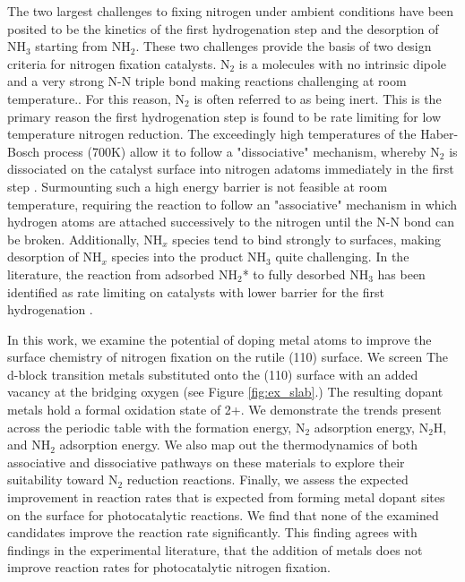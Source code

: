 The two largest challenges to fixing nitrogen under ambient conditions have been posited to be the kinetics of the first hydrogenation step and the desorption of NH$_3$ starting from NH$_2$.\cite{Hoskuldsson_2017,Singh_2017,Montoya_2015} These two challenges provide the basis of two design criteria for nitrogen fixation catalysts. N$_2$ is a molecules with no intrinsic dipole and a very strong N-N triple bond making reactions challenging at room temperature.\cite{Montoya_2015, Comer_2018}. For this reason, N$_2$ is often referred to as being inert. This is the primary reason the first hydrogenation step is found to be rate limiting for low temperature nitrogen reduction.\cite{Montoya_2015, Singh_2017, Hoskuldsson_2017, Comer_2018} The exceedingly high temperatures of the Haber-Bosch process (700K) allow it to follow a "dissociative" mechanism, whereby N$_2$ is dissociated on the catalyst surface into nitrogen adatoms immediately in the first step \cite{Ullmann_amm_2006, Hellman_2006}. Surmounting such a high energy barrier is not feasible at room temperature, requiring the reaction to follow an "associative" mechanism in which hydrogen atoms are attached successively to the nitrogen until the N-N bond can be broken.\cite{Montoya_2015} Additionally, NH$_x$ species tend to bind strongly to surfaces, making desorption of NH$_x$ species into the product NH$_3$ quite challenging. In the literature, the reaction from adsorbed NH$_2$* to fully desorbed NH$_3$ has been identified as rate limiting on catalysts with lower barrier for the first hydrogenation \cite{Hoskuldsson_2017}.

In this work, we examine the potential of doping metal atoms to improve the surface chemistry of nitrogen fixation on the rutile (110) surface. We screen The d-block transition metals substituted onto the (110) surface with an added vacancy at the bridging oxygen (see Figure \ref{fig:ex_slab}.) The resulting dopant metals hold a formal oxidation state of 2+. We demonstrate the trends present across the periodic table with the formation energy, N$_2$ adsorption energy, N$_2$H, and NH$_2$ adsorption energy. We also map out the thermodynamics of both associative and dissociative pathways on these materials to explore their suitability toward N$_2$ reduction reactions. Finally, we assess the expected improvement in reaction rates that is expected from forming metal dopant sites on the surface for photocatalytic reactions. We find that none of the examined candidates improve the reaction rate significantly. This finding agrees with findings in the experimental literature, that the addition of metals does not improve reaction rates for photocatalytic nitrogen fixation.

